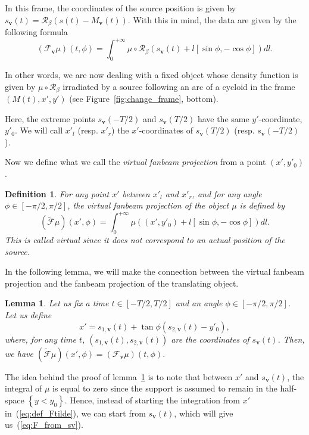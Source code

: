 \documentclass[twocolumn]{IEEEtran}
\newcommand{\bv}{\mathbf{v}}
\newcommand{\Mbv}{M_{\mathbf{v}}}
\newcommand{\Tbv}{\mathcal{F}_{\mathbf{v}}}
\newcommand{\sbv}{s_{\mathbf{v}}}
\newtheorem{definition}{Definition}
\newtheorem{lemma}{Lemma}
\begin{document}
In this frame, the coordinates of the source position is given by $\sbv(t)=\mathcal{R}_{\beta} \left( s(t)-\Mbv(t) \right)$. With this in mind, the data are given by the following formula
\begin{equation}
	(\Tbv\mu)(t,\phi) = \int_0^{+\infty} \mu \circ \mathcal{R}_{\beta} \left( s_{\bv}(t) + l \left[ \sin \phi, -\cos \phi \right] \right) dl.
\label{eq:F_from_sv}
\end{equation}

In other words, we are now dealing with a fixed object whose density function is given by $\mu \circ \mathcal{R}_{\beta}$ irradiated by a source following an arc of a cycloid in the frame $\left(M(t), x', y'\right)$ (see Figure~\ref{fig:change_frame}, bottom).

Here, the extreme points $\sbv(-T/2)$ and $\sbv(T/2)$ have the same $y'$-coordinate, $y'_0$. We will call $x'_l$ (resp. $x'_r$) the $x'$-coordinates of $\sbv(T/2)$ (resp. $\sbv(-T/2)$).

Now we define what we call the \emph{virtual fanbeam projection} from a point $(x',y'_0)$.
\begin{definition}
	For any point $x'$ between $x'_l$ and $x'_r$, and for any angle $\phi \in \left[ -\pi/2, \pi/2\right]$, the \emph{virtual fanbeam projection} of the object $\mu$ is defined by
\begin{equation}
	\left( \tilde{\mathcal{F}}\mu	\right)(x',\phi) = \int_0^{+\infty} \mu \left( (x',y'_0) + l \left[ \sin \phi, -\cos \phi \right] \right) dl.
\label{eq:def_Ftilde}
\end{equation}
This is called \emph{virtual} since it does not correspond to an actual position of the source.
\end{definition}

In the following lemma, we will make the connection between the virtual fanbeam projection and the fanbeam projection of the translating object.
\begin{lemma}
	Let us fix a time $t \in \left[ -T/2, T/2\right]$ and an angle $\phi \in \left[ -\pi/2, \pi/2\right]$. Let us define
	\begin{equation}
		x' = s_{1,\bv}(t) + \tan \phi \left( s_{2,\bv}(t) - y'_0 \right),
		\label{eq:x'}
	\end{equation}
	where, for any time $t$, $\left( s_{1,\bv}(t), s_{2,\bv}(t) \right)$ are the coordinates of $\sbv(t)$.
	Then, we have $\left( \tilde{\mathcal{F}}\mu \right)(x',\phi) = \left( \Tbv \mu \right)(t,\phi)$.
\label{lem:T_x_t}
\end{lemma}
The idea behind the proof of lemma~\ref{lem:T_x_t} is to note that between $x'$ and $\sbv(t)$, the integral of $\mu$ is equal to zero since the support is assumed to remain in the half-space $\left\{ y<y_0 \right\}$. Hence, instead of starting the integration from $x'$ in~(\ref{eq:def_Ftilde}), we can start from $\sbv(t)$, which will give us~(\ref{eq:F_from_sv}).
\end{document}

